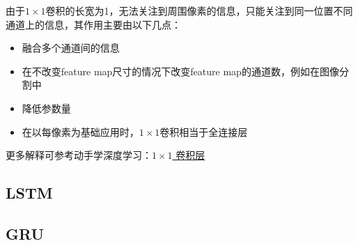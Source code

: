 由于$1\times 1$卷积的长宽为1，无法关注到周围像素的信息，只能关注到同一位置不同通道上的信息，其作用主要由以下几点：
\begin{itemize}
	\item 融合多个通道间的信息
	\item 在不改变feature map尺寸的情况下改变feature map的通道数，例如在图像分割中
	\item 降低参数量
	\item 在以每像素为基础应用时，$1\times 1$卷积相当于全连接层
\end{itemize}
更多解释可参考动手学深度学习：\href{https://zh-v2.d2l.ai/chapter_convolutional-neural-networks/channels.html#times-1}{$1\times 1$  卷积层}

\subsection{LSTM}

\subsection{GRU}